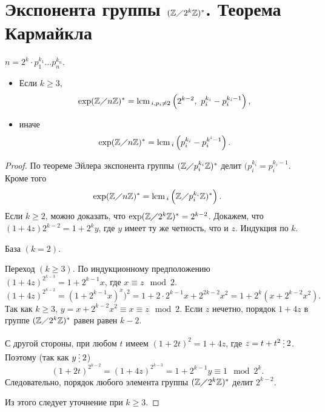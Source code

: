 \documentclass[11pt]{book}
\newcommand{\Z}{\mathbb{Z}}
\newcommand{\po}{\diagup}
\newcommand{\lcm}{{\mathop{\text{\rm lcm}}\,}}
\newcommand{\del}{{\:\small \raisebox{-2pt}{\vdots}\:}}
\renewcommand{\ge}{\geqslant}
\theoremstyle{definition}
\theoremstyle{plain}
\theoremstyle{plain}
\theoremstyle{definition}
\theoremstyle{remark}
\begin{document}
\section{Экспонента группы $ (\Z \po 2^{k}\Z)^{*}$. Теорема Кармайкла }
\begin{thm}[Кармайкла]
    $ n = 2^{k} \cdot p_1^{k_1} \ldots p_n^{k_n}$.
    \begin{itemize}
	\item Если  $ k \ge 3$,
	    \[
		\exp (\Z \po n\Z)^{*} = \lcm_{i, p_i \ne 2}\left(2^{k-2},~ p_i^{k_i} - p_i^{k_i-1}\right)
	    ,\]
	\item иначе
	    \[
		\exp (\Z \diagup n \Z)^{*}= \lcm _i \left(p_i^{k_i} - p_i^{k^{i}-1}\right)
	    .\]
    \end{itemize}
\end{thm}
\begin{proof}
    По теореме Эйлера экспонента группы $ (\Z\po p_{i}^{k_i} \Z)^{*}$ делит $ (p_i^{k_i} = p_{i}^{k_i -1}$. Кроме того
    \[
	\exp (\Z\po n\Z)^{*} = \lcm_i \left(\Z \po p_{i}^{k_i}\Z)^{*}\right)
    .\]
    Если $ k \ge 2$, можно доказать, что $ \exp (\Z\po 2^{k}\Z)^{*}  = 2^{k-2}$.
    Докажем, что $ (1 + 4z)2^{k-2} = 1+2^{k} y$, где $ y$  имеет ту же четность, что и $ z$.
    Индукция по $ k$.
    \begin{description}
	\item База $ (k = 2)$.
	\item Переход $ (k \ge 3)$.
	    По индукционному предположению $ (1+4z)^{2^{k-3}} = 1 + 2^{k-1}x$, где $ x \equiv z \mod 2$.
	    \[
		(1+4z)^{2^{k-2}} = (1+ 2^{k-1}x)^{x})^2 = 1 + 2 \cdot 2 ^{k-1} x + 2^{2k-2} x^2 = 1 + 2^{k}(x + 2 ^{k-2}x^2)
	    .\]
	    Так как $ k \ge 3$, $ y = x + 2^{k-2} x^2 \equiv x \equiv z \mod 2$. Если $ z $ нечетно, порядок  $ 1 + 4z$ в группе $ (\Z \po 2^{k}\Z)^{*}$ равен  равен $ k-2$.

	    С другой стороны, при любом  $ t$ имеем  $ (1 + 2t)^2 = 1 + 4 z$, где $ z = t +t^2 \del 2$. Поэтому (так как $ y \del 2$)
	    \[
		(1+2t)^{2^{k-2}} = (1+ 4z)^{2^{k-3}} = 1 + 2 ^{k-1} y \equiv 1 \mod 2^{k}
	    .\]
	    Следовательно, порядок любого элемента группы $ (\Z \po 2^{k}\Z)^{*}$ делит $ 2^{k-2}$.
    \end{description}
    Из этого следует уточнение при $ k \ge  3$.
\end{proof}
\end{document}
